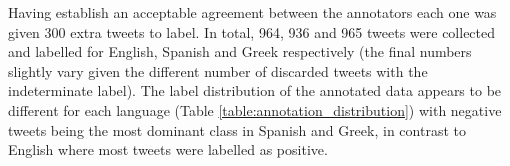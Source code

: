 \begin{table}[ht]
\centering
{}
\caption{Inter-annotator agreement based on Cohen's Kappa}
\label{table:annotation_agreement}
\end{table}

Having establish an acceptable agreement between the annotators each one was given 300 extra tweets to label. In total, 964, 936 and 965 tweets were collected and labelled for English, Spanish and Greek respectively (the final numbers slightly vary given the different number of discarded tweets with the indeterminate label). The label distribution of the annotated data appears to be different for each language (Table \ref{table:annotation_distribution}) with negative tweets being the most dominant class in Spanish and Greek, in contrast to English where most tweets were labelled as positive. 


\begin{table}[ht]
\centering
{}
\caption{Distribution of labels in the annotated dataset for each country.}
\label{table:annotation_distribution}
\end{table}


